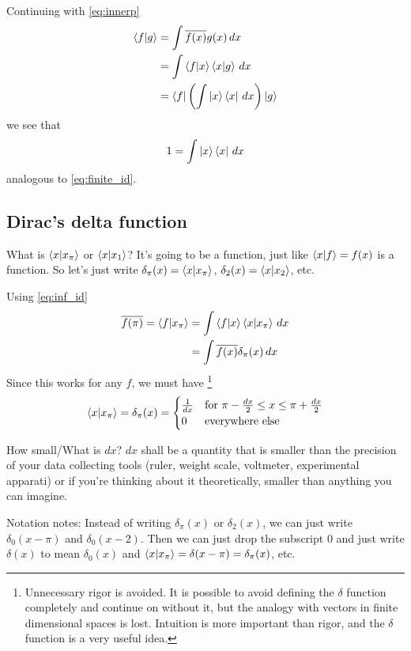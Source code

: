 \documentclass[12pt, oneside, letterpaper, fleqn]{article}
\begin{document}
Continuing with \eqref{eq:innerp}
\begin{align*}
\left\langle f\middle\vert g\right\rangle &= \int \overline{f(x)}g(x)\,dx\\
&= \int \left\langle f\middle\vert x\right\rangle\left\langle x\middle\vert g\right\rangle\,dx\\
&= \left\langle f\right\rvert \left(\int \left\lvert x\right\rangle\left\langle x\right\rvert\,dx\right) \left\lvert g\right\rangle
\end{align*}
we see that
\begin{align}\label{eq:inf_id}
1 = \int \left\lvert x\right\rangle\left\langle x\right\rvert\,dx
\end{align}
analogous to \eqref{eq:finite_id}.

\subsection{Dirac's delta function}
What is $\left\langle x\middle\vert x_\pi\right\rangle$ or $\left\langle x\middle\vert x_1\right\rangle$? It's going to be a
function, just like $\left\langle x\middle\vert f\right\rangle = f(x)$ is a function. So let's just
write $\delta_\pi(x) = \left\langle x\middle\vert x_\pi\right\rangle$, $\delta_2(x) =
\left\langle x\middle\vert x_2\right\rangle$, etc.

Using \eqref{eq:inf_id}
\begin{align*}
\overline{f(\pi)} = \left\langle f\middle\vert x_\pi\right\rangle &= \int
\left\langle f\middle\vert x\right\rangle\left\langle x\middle\vert x_\pi\right\rangle\,dx\\
&= \int \overline{f(x)} \delta_\pi(x)\,dx
\end{align*}
Since this works for any $f$, we must have
\footnote{Unnecessary rigor is avoided. It is possible to avoid
defining the $\delta$ function completely and continue on without it,
but the analogy with vectors in finite dimensional spaces is lost.
Intuition is more important than rigor, and the $\delta$ function is
a very useful idea.}
\begin{align*}
\left\langle x\middle\vert x_\pi\right\rangle = \delta_\pi(x) = \begin{cases}
\frac{1}{dx} & \text{for } \pi-\frac{dx}{2} \leq x \leq
\pi+\frac{dx}{2}\\
0 & \text{everywhere else}
\end{cases}
\end{align*}

How small/What is $dx$? $dx$ shall be a quantity that is smaller than the
precision of your data collecting tools (ruler, weight scale,
voltmeter, experimental apparati) or if you're thinking about it
theoretically, smaller than anything you can imagine.

Notation notes: Instead of writing $\delta_\pi(x)$ or $\delta_2(x)$, we
can just write $\delta_0(x-\pi)$ and $\delta_0(x-2)$. Then we can just
drop the subscript $0$ and just write $\delta(x)$ to mean $\delta_0(x)$
and $\left\langle x\middle\vert x_\pi\right\rangle = \delta(x-\pi) = \delta_\pi(x)$, etc.
\end{document}
